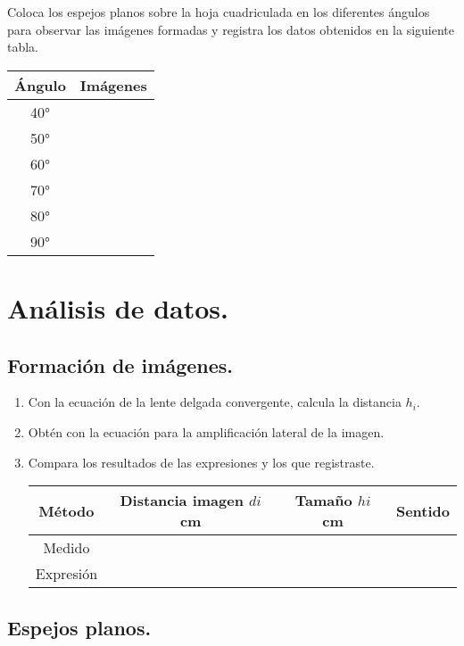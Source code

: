 \documentclass[14pt]{extarticle}
\begin{document}
Coloca los espejos planos sobre la hoja cuadriculada en los diferentes ángulos para observar las imágenes formadas y registra los datos obtenidos en la siguiente tabla.
\begin{table}[H]
    \centering
    \begin{tabular}{| c | c |} \hline
    Ángulo & Imágenes \\ \hline
    \ang{40} & \\ \hline
    \ang{50} & \\ \hline
    \ang{60} & \\ \hline
    \ang{70} & \\ \hline
    \ang{80} & \\ \hline
    \ang{90} & \\ \hline
    \end{tabular}
\end{table}

\section{Análisis de datos.}

\subsection{Formación de imágenes.}

\begin{enumerate}
\item Con la ecuación de la lente delgada convergente, calcula la distancia $h_{i}$.
\item Obtén con la ecuación para la amplificación lateral de la imagen.
\item Compara los resultados de las expresiones y los que registraste.
\begin{table}[H]
    \centering
    \begin{tabular}{| c | c | c | c |} \hline
    Método & Distancia imagen $d{i}$ \unit{\centi\meter} & Tamaño $h{i}$ \unit{\centi\meter} & Sentido \\ \hline
    Medido & & & \\ \hline
    Expresión & & & \\ \hline
    \end{tabular}
\end{table}
\end{enumerate}

\subsection{Espejos planos.}
\end{document}
